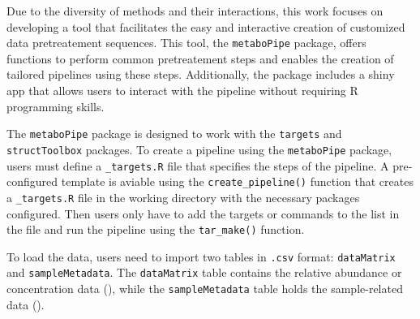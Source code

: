 \documentclass[ENG, BIB]{TFUOC}%
\begin{document}

Due to the diversity of methods and their interactions, this work focuses on developing a tool that facilitates the easy and interactive creation of customized data pretreatement sequences. This tool, the \texttt{metaboPipe} package, offers functions to perform common pretreatement steps and enables the creation of tailored pipelines using these steps. Additionally, the package includes a shiny app that allows users to interact with the pipeline without requiring R programming skills.

The \texttt{metaboPipe} package is designed to work with the \texttt{targets} and \texttt{structToolbox} packages. To create a pipeline using the \texttt{metaboPipe} package, users must define a \texttt{\_targets.R} file that specifies the steps of the pipeline. A pre-configured template is aviable using the \texttt{create\_pipeline()} function that creates a \texttt{\_targets.R} file in the working directory with the necessary packages configured. Then users only have to add the targets or commands to the list in the file and run the pipeline using the \texttt{tar\_make()} function.

To load the data, users need to import two tables in \texttt{.csv} format: \texttt{dataMatrix} and \texttt{sampleMetadata}. The \texttt{dataMatrix} table contains the relative abundance or concentration data (), while the \texttt{sampleMetadata} table holds the sample-related data ().
\end{document}

